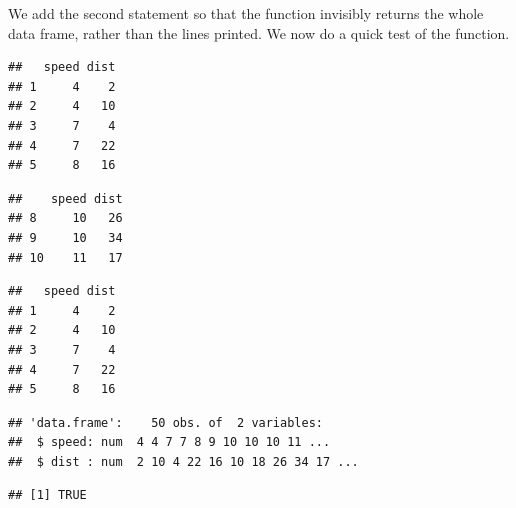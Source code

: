 \documentclass[krantz2]{krantz}\usepackage{knitr}
\begin{document}
\begin{explainbox}
We add the second statement so that the function invisibly returns the whole data frame, rather than the lines printed. We now do a quick test of the function.

\begin{knitrout}\footnotesize
{}\color{fgcolor}\begin{kframe}
\begin{alltt}
\end{alltt}
\begin{verbatim}
##   speed dist
## 1     4    2
## 2     4   10
## 3     7    4
## 4     7   22
## 5     8   16
\end{verbatim}
\end{kframe}
\end{knitrout}

\begin{knitrout}\footnotesize
{}\color{fgcolor}\begin{kframe}
\begin{alltt}
 \hlopt{:}\hlstd{)}
\end{alltt}
\begin{verbatim}
##    speed dist
## 8     10   26
## 9     10   34
## 10    11   17
\end{verbatim}
\end{kframe}
\end{knitrout}

\begin{knitrout}\footnotesize
{}\color{fgcolor}\begin{kframe}
\begin{alltt}
 \hlkwb{<-} 
\end{alltt}
\begin{verbatim}
##   speed dist
## 1     4    2
## 2     4   10
## 3     7    4
## 4     7   22
## 5     8   16
\end{verbatim}
\begin{alltt}
\end{alltt}
\begin{verbatim}
## 'data.frame':	50 obs. of  2 variables:
##  $ speed: num  4 4 7 7 8 9 10 10 10 11 ...
##  $ dist : num  2 10 4 22 16 10 18 26 34 17 ...
\end{verbatim}
\begin{alltt}
 \hlopt{==}  
\end{alltt}
\begin{verbatim}
## [1] TRUE
\end{verbatim}
\end{kframe}
\end{knitrout}


\end{explainbox}
\end{document}
